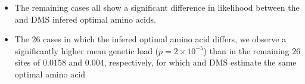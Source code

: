\documentclass[12pt]{article}
\begin{document}
\begin{itemize}
\begin{itemize}
\begin{itemize}
			\item The remaining cases all show a significant difference in likelihood between the \selac and DMS infered optimal amino acids.
			\item The $26$ cases in which the infered optimal amino acid differs, we observe a significantly higher mean genetic load ($p = 2\times10^{-5}$) than in the remaining $26$ sites of $0.0158$ and $0.004$, respectively, for which \selac and DMS estimate the same optimal amino acid
		\end{itemize}
	\end{itemize}
\end{itemize}


    
\end{document}
